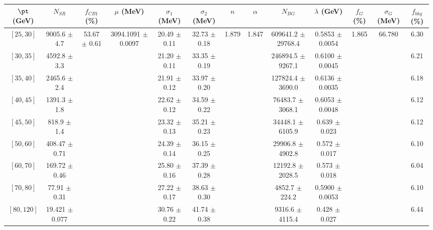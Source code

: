 \begin{tabular}{c||c|c|c|c|c|c|c|c|c|c|c||c}
$\pt$ (GeV) & $N_{SR}$ & $f_{CB1}$ (\%) & $\mu$ (MeV) & $\sigma_1$ (MeV) & $\sigma_2$ (MeV) & $n$ & $\alpha$ & $N_{BG}$ & $\lambda$ (GeV) & $f_G$ (\%) & $\sigma_G$ (MeV) & $f_{bkg}$ (\%) \\
\hline
$[25, 30]$ & 9005.6 $\pm$ 4.7 & \multirow{9}{*}{53.67 $\pm$ 0.61} & \multirow{9}{*}{3094.1091 $\pm$ 0.0097} & 20.49 $\pm$ 0.11 & 32.73 $\pm$ 0.18 & \multirow{9}{*}{1.879} & \multirow{9}{*}{1.847} & 609641.2 $\pm$ 29768.4 & 0.5853 $\pm$ 0.0054 & \multirow{9}{*}{1.865} & \multirow{9}{*}{66.780} & 6.30\\
$[30, 35]$ & 4592.8 $\pm$ 3.3 &  &  & 21.20 $\pm$ 0.11 & 33.35 $\pm$ 0.19 &  &  & 246894.5 $\pm$ 9267.1 & 0.6100 $\pm$ 0.0045 &  &  & 6.21\\
$[35, 40]$ & 2465.6 $\pm$ 2.4 &  &  & 21.91 $\pm$ 0.12 & 33.97 $\pm$ 0.20 &  &  & 127824.4 $\pm$ 3690.0 & 0.6136 $\pm$ 0.0035 &  &  & 6.18\\
$[40, 45]$ & 1391.3 $\pm$ 1.8 &  &  & 22.62 $\pm$ 0.12 & 34.59 $\pm$ 0.22 &  &  & 76483.7 $\pm$ 3068.1 & 0.6053 $\pm$ 0.0048 &  &  & 6.12\\
$[45, 50]$ & 818.9 $\pm$ 1.4 &  &  & 23.32 $\pm$ 0.13 & 35.21 $\pm$ 0.23 &  &  & 34448.1 $\pm$ 6105.9 & 0.639 $\pm$ 0.023 &  &  & 6.12\\
$[50, 60]$ & 408.47 $\pm$ 0.71 &  &  & 24.39 $\pm$ 0.14 & 36.15 $\pm$ 0.25 &  &  & 29906.8 $\pm$ 4902.8 & 0.572 $\pm$ 0.017 &  &  & 6.10\\
$[60, 70]$ & 169.72 $\pm$ 0.46 &  &  & 25.80 $\pm$ 0.16 & 37.39 $\pm$ 0.28 &  &  & 12192.8 $\pm$ 2028.5 & 0.573 $\pm$ 0.018 &  &  & 6.04\\
$[70, 80]$ & 77.91 $\pm$ 0.31 &  &  & 27.22 $\pm$ 0.17 & 38.63 $\pm$ 0.30 &  &  & 4852.7 $\pm$ 224.2 & 0.5900 $\pm$ 0.0053 &  &  & 6.10\\
$[80, 120]$ & 19.421 $\pm$ 0.077 &  &  & 30.76 $\pm$ 0.22 & 41.74 $\pm$ 0.38 &  &  & 9316.6 $\pm$ 4115.4 & 0.428 $\pm$ 0.027 &  &  & 6.44\\
\end{tabular}
